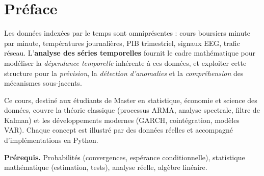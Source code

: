 \documentclass[12pt,a4paper,twoside]{book}
\theoremstyle{definition}
\theoremstyle{plain}
\theoremstyle{remark}
\begin{document}
\frontmatter
\begin{titlepage}
\end{titlepage}
\tableofcontents

\chapter*{Pr\'eface}

Les donn\'ees index\'ees par le temps sont omnipr\'esentes : cours boursiers minute par minute, temp\'eratures journali\`eres, PIB trimestriel, signaux EEG, trafic r\'eseau. L'\textbf{analyse des s\'eries temporelles} fournit le cadre math\'ematique pour mod\'eliser la \emph{d\'ependance temporelle} inh\'erente \`a ces donn\'ees, et exploiter cette structure pour la \emph{pr\'evision}, la \emph{d\'etection d'anomalies} et la \emph{compr\'ehension} des m\'ecanismes sous-jacents.

\medskip
Ce cours, destin\'e aux \'etudiants de Master en statistique, \'economie et science des donn\'ees, couvre la th\'eorie classique (processus ARMA, analyse spectrale, filtre de Kalman) et les d\'eveloppements modernes (GARCH, coint\'egration, mod\`eles VAR). Chaque concept est illustr\'e par des donn\'ees r\'eelles et accompagn\'e d'impl\'ementations en Python.

\medskip
\textbf{Pr\'erequis.} Probabilit\'es (convergences, esp\'erance conditionnelle), statistique math\'ematique (estimation, tests), analyse r\'eelle, alg\`ebre lin\'eaire.
\end{document}

